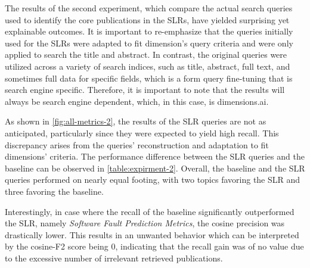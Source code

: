 The results of the second experiment, which compare the actual search queries used to identify the core publications in the SLRs, have yielded surprising yet explainable outcomes. It is important to re-emphasize that the queries initially used for the SLRs were adapted to fit dimension's query criteria and were only applied to search the title and abstract. In contrast, the original queries were utilized across a variety of search indices, such as title, abstract, full text, and sometimes full data for specific fields, which is a form query fine-tuning that is search engine specific. Therefore, it is important to note that the results will always be search engine dependent, which, in this case, is dimensions.ai.

As shown in \autoref{fig:all-metrics-2}, the results of the SLR queries are not as anticipated, particularly since they were expected to yield high recall. This discrepancy arises from the queries' reconstruction and adaptation to fit dimensions' criteria. The performance difference between the SLR queries and the baseline can be observed in \autoref{table:expirment-2}. Overall, the baseline and the SLR queries performed on nearly equal footing, with two topics favoring the SLR and three favoring the baseline. 

Interestingly, in case where the recall of the baseline significantly outperformed the SLR, namely \textit{Software Fault Prediction Metrics}, the cosine precision was drastically lower. This results in an unwanted behavior which can be interpreted by the cosine-F2 score being 0, indicating that the recall gain was of no value due to the excessive number of irrelevant retrieved publications.


